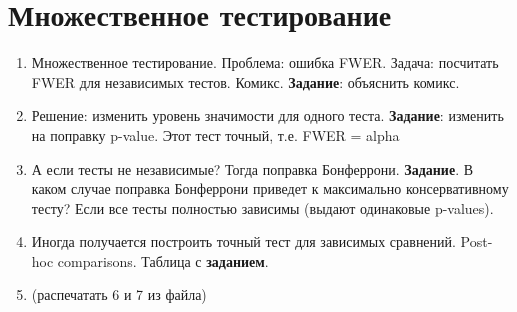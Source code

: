\section{Множественное тестирование}
\begin{enumerate}
\item	Множественное тестирование. Проблема: ошибка FWER. Задача: посчитать FWER для независимых тестов. Комикс. \textbf{Задание}: объяснить комикс.
\item	Решение: изменить уровень значимости для одного теста. \textbf{Задание}: изменить на поправку p-value. Этот тест точный, т.е. FWER = alpha
\item	А если тесты не независимые? Тогда поправка Бонферрони.
\textbf{Задание}. В каком случае поправка Бонферрони приведет к максимально консервативному тесту? Если все тесты полностью зависимы (выдают одинаковые p-values).
\item	Иногда получается построить точный тест для зависимых сравнений. Post-hoc comparisons. Таблица с \textbf{заданием}.
\item	(распечатать 6 и 7 из файла)
\end{enumerate}

